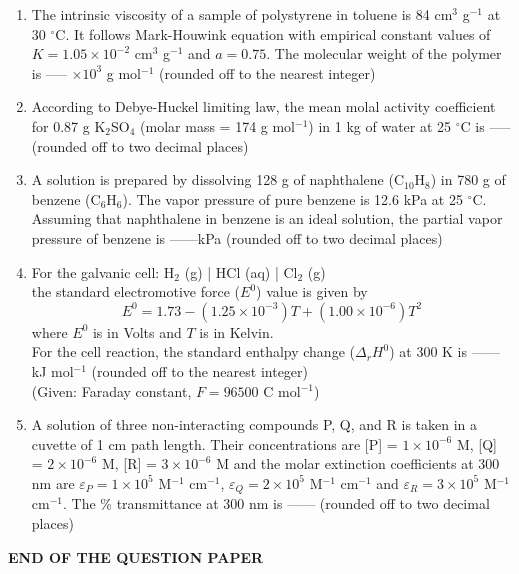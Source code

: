 \documentclass[journal,12pt,onecolumn]{IEEEtran}
\theoremstyle{remark}
\begin{document}
\begin{enumerate}
\item The intrinsic viscosity of a sample of polystyrene in toluene is 84 cm$^3$ g$^{-1}$ at 30 $^\circ$C. It follows Mark-Houwink equation with empirical constant values of $K = 1.05 \times 10^{-2}$ cm$^3$ g$^{-1}$ and $a = 0.75$. The molecular weight of the polymer is ----- $\times 10^3$ g mol$^{-1}$ (rounded off to the nearest integer)

\item According to Debye-Huckel limiting law, the mean molal activity coefficient for 0.87 g K$_2$SO$_4$ (molar mass = 174 g mol$^{-1}$) in 1 kg of water at 25 $^\circ$C is ----- (rounded off to two decimal places)

\newpage



\item A solution is prepared by dissolving 128 g of naphthalene (C$_{10}$H$_8$) in 780 g of benzene (C$_6$H$_6$). The vapor pressure of pure benzene is 12.6 kPa at 25 $^\circ$C. Assuming that naphthalene in benzene is an ideal solution, the partial vapor pressure of benzene is ------kPa (rounded off to two decimal places)

\item For the galvanic cell: H$_2$ (g) | HCl (aq) | Cl$_2$ (g) \\
the standard electromotive force ($E^0$) value is given by
\[
E^0 = 1.73 - (1.25 \times 10^{-3})T + (1.00 \times 10^{-6})T^2
\]
where $E^0$ is in Volts and $T$ is in Kelvin. \\
For the cell reaction, the standard enthalpy change ($\Delta_r H^0$) at 300 K is ------ kJ mol$^{-1}$ (rounded off to the nearest integer) \\
(Given: Faraday constant, $F = 96500$ C mol$^{-1}$)

\item A solution of three non-interacting compounds P, Q, and R is taken in a cuvette of 1 cm path length. Their concentrations are [P] = $1 \times 10^{-6}$ M, [Q] = $2 \times 10^{-6}$ M, [R] = $3 \times 10^{-6}$ M and the molar extinction coefficients at 300 nm are $\varepsilon_P = 1 \times 10^{5}$ M$^{-1}$ cm$^{-1}$, $\varepsilon_Q = 2 \times 10^{5}$ M$^{-1}$ cm$^{-1}$ and $\varepsilon_R = 3 \times 10^{5}$ M$^{-1}$ cm$^{-1}$. The \% transmittance at 300 nm is ------ (rounded off to two decimal places)

\end{enumerate}

\vspace{3 cm}


\begin{center}
    \textbf{END OF THE QUESTION PAPER}
\end{center}
\end{document}
